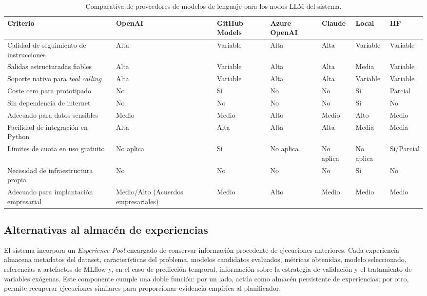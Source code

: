 \documentclass[12pt,a4paper]{article}
\theoremstyle{plain}
\begin{document}
\begin{table}[htbp]
\centering
\scriptsize
\setlength{\tabcolsep}{3pt}
\renewcommand{\arraystretch}{1.05}
\begin{tabularx}{\linewidth}{>{\RaggedRight\arraybackslash}X *{6}{>{\RaggedRight\arraybackslash}X}}
\hline
\textbf{Criterio} & \textbf{OpenAI} & \textbf{GitHub Models} & \textbf{Azure OpenAI} & \textbf{Claude} & \textbf{Local} & \textbf{HF} \\\hline
Calidad de seguimiento de instrucciones & Alta & Variable & Alta & Alta & Variable & Variable \\\hline
Salidas estructuradas fiables & Alta & Variable & Alta & Alta & Media & Variable \\\hline
Soporte nativo para \textit{tool calling} & Alta & Variable & Alta & Alta & Variable & Variable \\\hline
Coste cero para prototipado & No & Sí & No & No & Sí & Parcial \\\hline
Sin dependencia de internet & No & No & No & No & Sí & No \\\hline
Adecuado para datos sensibles & Medio & Medio & Alto & Medio & Alto & Medio \\\hline
Facilidad de integración en Python & Alta & Alta & Alta & Alta & Media & Media \\\hline
Límites de cuota en uso gratuito & No aplica & Sí & No aplica & No aplica & No aplica & Sí/Parcial \\\hline
Necesidad de infraestructura propia & No & No & No & No & Sí & No \\\hline
Adecuado para implantación empresarial & Medio/Alto (Acuerdos empresariales) & Medio & Alto & Medio & Medio & Medio \\\hline
\end{tabularx}
\caption{Comparativa de proveedores de modelos de lenguaje para los nodos LLM del sistema.}
\label{tab:alt-proveedor}
\end{table}



\subsection{Alternativas al almacén de experiencias}
\label{sec:alt-experiencia}

El sistema incorpora un \textit{Experience Pool} encargado de conservar información procedente de ejecuciones anteriores. Cada experiencia almacena metadatos del dataset, características del problema, modelos candidatos evaluados, métricas obtenidas, modelo seleccionado, referencias a artefactos de MLflow y, en el caso de predicción temporal, información sobre la estrategia de validación y el tratamiento de variables exógenas. Este componente cumple una doble función: por un lado, actúa como almacén persistente de experiencias; por otro, permite recuperar ejecuciones similares para proporcionar evidencia empírica al planificador.
\end{document}

